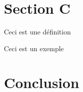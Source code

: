 \section{Section C}

\begin{definition}
  Ceci est une définition
\end{definition}

\begin{example}
  Ceci est un exemple
\end{example}


\section{Conclusion}
